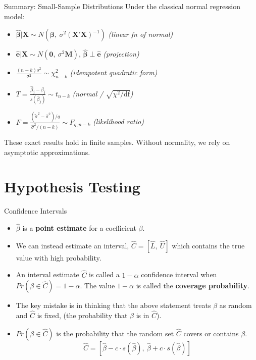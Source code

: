 \documentclass[aspectratio=169, handout, t]{beamer}
\numberwithin{equation}{section}
\begin{document}
\begin{frame}{Summary: Small-Sample Distributions}
Under the classical normal regression model:\pause
\begin{itemize}\setlength{\itemsep}{4pt}
\item $\hat{\bm{\beta}}|\bm{X}\sim N(\bm{\beta},\ \sigma^2(\bm{X'X})^{-1})$ \hfill \emph{(linear fn of normal)}\pause
\item $\hat{\bm{e}}|\bm{X}\sim N(\bm{0},\ \sigma^2\bm{M})$, \quad $\hat{\bm{\beta}}\perp\hat{\bm{e}}$ \hfill \emph{(projection)}\pause
\item $\frac{(n-k)s^2}{\sigma^2}\sim \chi^2_{n-k}$ \hfill \emph{(idempotent quadratic form)}\pause
\item $T=\frac{\hat{\beta}_j-\beta_j}{s(\hat{\beta}_j)}\sim t_{n-k}$ \hfill \emph{(normal / $\sqrt{\chi^2/\text{df}}$)}\pause
\item $F=\frac{(\tilde{\sigma}^2-\hat{\sigma}^2)/q}{\hat{\sigma}^2/(n-k)}\sim F_{q,n-k}$ \hfill \emph{(likelihood ratio)}\pause
\end{itemize}
\medskip
These \alert{exact} results hold in finite samples.  Without normality, we rely on asymptotic approximations.
\end{frame}

\section{Hypothesis Testing}

\begin{frame}{Confidence Intervals}
\begin{itemize}
\item $\hat{\beta}$ is a \textbf{point estimate} for a coefficient $\beta$.  \pause
\item We can instead estimate an interval, $\hat{C}=[\hat{L},\ \hat{U}]$ which contains the true value with high probability. \pause
\item An interval estimate $\hat{C}$ is called a $1-\alpha$ confidence interval when $Pr(\beta \in \hat{C})=1-\alpha$.  The value $1-\alpha$ is called the \textbf{coverage probability}. \pause
\item The key mistake is in thinking that the above statement treats $\beta$ as random and $\hat{C}$ is fixed, (the probability that $\beta$ is in $\hat{C}$).   \pause
\item $Pr(\beta \in \hat{C})$ is the probability that the random set $\hat{C}$ covers or contains $\beta$.  \pause
$$\hat{C}=[\hat{\beta}-c\cdot s(\hat{\beta}),\ \hat{\beta}+c\cdot s(\hat{\beta})]$$
\end{itemize}
\end{frame}
\end{document}
